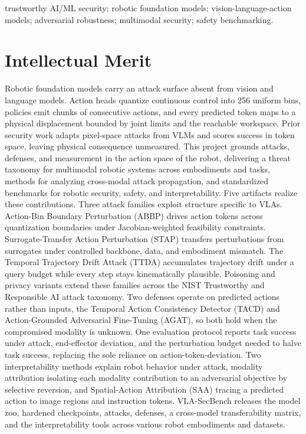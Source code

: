 \documentclass[11pt,letterpaper]{article}
\begin{document}
 trustworthy AI/ML security; robotic foundation models; vision-language-action models; adversarial robustness; multimodal security; safety benchmarking.


\section{Intellectual Merit}
Robotic foundation models carry an attack surface absent from vision and language models. Action heads quantize continuous control into 256 uniform bins, policies emit chunks of consecutive actions, and every predicted token maps to a physical displacement bounded by joint limits and the reachable workspace. Prior security work adapts pixel-space attacks from VLMs and scores success in token space, leaving physical consequence unmeasured. This project grounds attacks, defenses, and measurement in the action space of the robot, delivering  a threat taxonomy for multimodal robotic systems across embodiments and tasks,  methods for analyzing cross-modal attack propagation, and  standardized benchmarks for robotic security, safety, and interpretability. Five artifacts realize these contributions.
 Three attack families exploit structure specific to VLAs. Action-Bin Boundary Perturbation (ABBP) drives action tokens across quantization boundaries under Jacobian-weighted feasibility constraints. Surrogate-Transfer Action Perturbation (STAP) transfers perturbations from surrogates under controlled backbone, data, and embodiment mismatch. The Temporal Trajectory Drift Attack (TTDA) accumulates trajectory drift under a query budget while every step stays kinematically plausible. Poisoning and privacy variants extend these families across the NIST Trustworthy and Responsible AI attack taxonomy.
 Two defenses operate on predicted actions rather than inputs, the Temporal Action Consistency Detector (TACD) and Action-Grounded Adversarial Fine-Tuning (AGAT), so both hold when the compromised modality is unknown. 
 One evaluation protocol reports task success under attack, end-effector deviation, and the perturbation budget needed to halve task success, replacing the sole reliance on action-token-deviation.
 Two interpretability methods explain robot behavior under attack, modality attribution isolating each modality contribution to an adversarial objective by selective reversion, and Spatial-Action Attribution (SAA) tracing a predicted action to image regions and instruction tokens.
 VLA-SecBench releases the model zoo, hardened checkpoints, attacks, defenses, a cross-model transferability matrix, and the interpretability tools across various robot embodiments and datasets.
\end{document}

